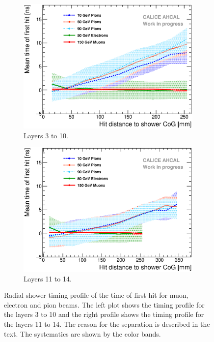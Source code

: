 \begin{figure}[htbp!]
	\begin{subfigure}[t]{0.49\textwidth}
		\centering
		\includegraphics[width=1\textwidth]{../Thesis_Plots/Timing/Pions/Plots/Timing_Radius_Comparison_ShortAsymRange_SSF.eps}
		\caption{Layers 3 to 10.}\label{fig:Radius_Comparison_SSF}
	\end{subfigure}
	\hfill
	\begin{subfigure}[t]{0.49\textwidth}
		\centering
		\includegraphics[width=1\textwidth]{../Thesis_Plots/Timing/Pions/Plots/Timing_Radius_Comparison_ShortAsymRange_BL.eps}
		\caption{Layers 11 to 14.}\label{fig:Radius_Comparison_BL}
	\end{subfigure}
	\caption{Radial shower timing profile of the time of first hit for muon, electron and pion beams. The left plot shows the timing profile for the layers 3 to 10 and the right profile shows the timing profile for the layers 11 to 14. The reason for the separation is described in the text. The systematics are shown by the color bands.}
	\label{fig:RadialTiming}
\end{figure}

